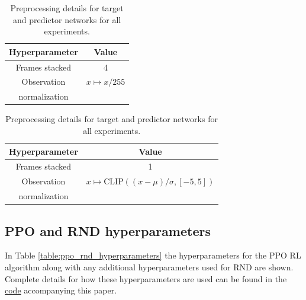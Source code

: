 \documentclass{article} %
\begin{document}
\begin{table}
\begin{minipage}[t]{0.48\textwidth}
\centering
\begin{tabular}{c | c} 
 Hyperparameter & Value  \\ [0.5ex] 
 \hline
 Frames stacked & 4  \\
 Observation & $x \mapsto x / 255$ \\ 
 normalization &  \\[1ex] 
\end{tabular}
\caption{Preprocessing details for policy and value network for all experiments.}
\label{table:preprocessing_policy}
\end{minipage}%
\hspace{0.5em}
\begin{minipage}[t]{0.48\textwidth}
\centering
\begin{tabular}{c | c} 
 Hyperparameter & Value  \\ [0.5ex] 
 \hline
 Frames stacked & 1  \\
 Observation & $x \mapsto \text{CLIP}\left((x - \mu) / \sigma, [-5, 5]\right)$ \\
 normalization & \\[1ex] 
\end{tabular}
\caption{Preprocessing details for target and predictor networks for all experiments.}
\label{table:preprocessing_predictor}
\end{minipage}
\end{table}

\subsection{PPO and RND hyperparameters}
\label{sec:ppornd_hyperparams}
In Table \ref{table:ppo_rnd_hyperparameters} the hyperparameters for the PPO RL algorithm along with any additional hyperparameters used for RND are shown. Complete details for how these hyperparameters are used can be found in the \href{https://github.com/openai/random-network-distillation}{code} accompanying this paper.
\end{document}
